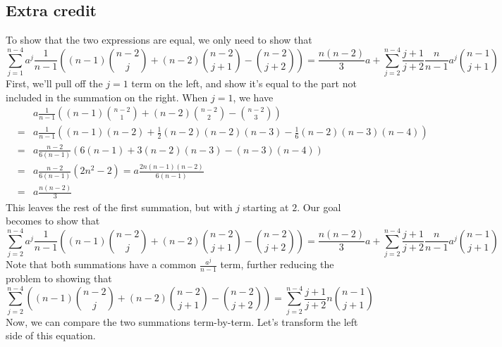 \documentclass{article}
\begin{document}
\subsection{Extra credit}
To show that the two expressions are equal, we only need to show that 
\[ \sum_{j=1}^{n-4} a^j \frac{1}{n-1}\left( (n-1)\binom{n-2}{j} + (n-2)\binom{n-2}{j+1} - \binom{n-2}{j+2} \right) =
\frac{n(n-2)}{3}a + \sum_{j=2}^{n-4}\frac{j+1}{j+2}\frac{n}{n-1}a^j \binom{n-1}{j+1} 
\]
First, we'll pull off the $j = 1$ term on the left, and show it's equal to the part not included in the summation on the right.
When $j=1$, we have
\begin{eqnarray*}
& & a\frac{1}{n-1}\left( (n-1)\binom{n-2}{1} + (n-2)\binom{n-2}{2} - \binom{n-2}{3} \right) \\
&=&  a\frac{1}{n-1}\left( (n-1)(n-2) + \frac{1}{2}(n-2)(n-2)(n-3) - \frac{1}{6}(n-2)(n-3)(n-4) \right) \\
&=&  a\frac{n-2}{6(n-1)}\left(6(n-1) + 3(n-2)(n-3) - (n-3)(n-4) \right) \\
&=&  a\frac{n-2}{6(n-1)}(2n^2 - 2) =  a\frac{2n(n-1)(n-2)}{6(n-1)} \\
&=&  a\frac{n(n-2)}{3}
\end{eqnarray*}
This leaves the rest of the first summation, but with $j$ starting at $2$. Our goal becomes to show that
\[
\sum_{j=2}^{n-4} a^j \frac{1}{n-1}\left( (n-1)\binom{n-2}{j} + (n-2)\binom{n-2}{j+1} - \binom{n-2}{j+2} \right) 
 = \frac{n(n-2)}{3}a + \sum_{j=2}^{n-4}\frac{j+1}{j+2}\frac{n}{n-1}a^j \binom{n-1}{j+1} 
\]
Note that both summations have a common $\frac{a^j}{n-1}$ term, further reducing the problem to showing that
\[
\sum_{j=2}^{n-4} \left( (n-1)\binom{n-2}{j} + (n-2)\binom{n-2}{j+1} - \binom{n-2}{j+2} \right) 
 = \sum_{j=2}^{n-4}\frac{j+1}{j+2}n \binom{n-1}{j+1} 
\]
Now, we can compare the two summations term-by-term. Let's transform the left side of this equation.
\end{document}
